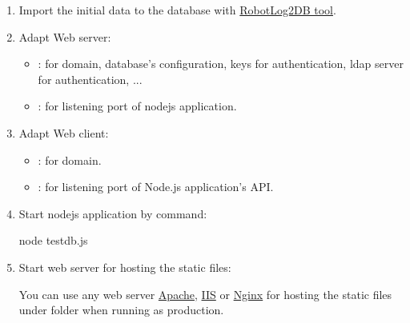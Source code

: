 \begin{enumerate}
\begin{itemize}
\begin{itemize}
\item create all store procedures by loading all SQL scripts under 
       folder then execute them.

\begin{boxhint}{Notice}
If you have created your schema with other name than the default 
name \emph{pjcmd\_bvt}, you should replace the schema name before executing SQL 
scripts.
\end{boxhint}

\end{itemize}

\end{itemize}

\item Import the initial data to the database with \href{https://github.com/test-fullautomation/robotframework-robotlog2db}{RobotLog2DB tool}.

\item Adapt Web server:
\begin{itemize}
   \item {}: for domain, database's configuration,
         keys for authentication, ldap server for authentication, ...
   \item {}: for listening port of nodejs application.
\end{itemize}

\item Adapt Web client:
\begin{itemize}
   \item {}: for domain.
   \item {}: for 
         listening port of Node.js application's API.
\end{itemize}

\item Start nodejs application by command:
\begin{robotlog}
node testdb.js
\end{robotlog}

\item Start web server for hosting the static files:

You can use any web server \href{https://httpd.apache.org/}{Apache}, 
\href{https://www.iis.net/}{IIS} or \href{https://www.nginx.com/}{Nginx} for 
hosting the static files under  folder when running 
as production.


\end{enumerate}
